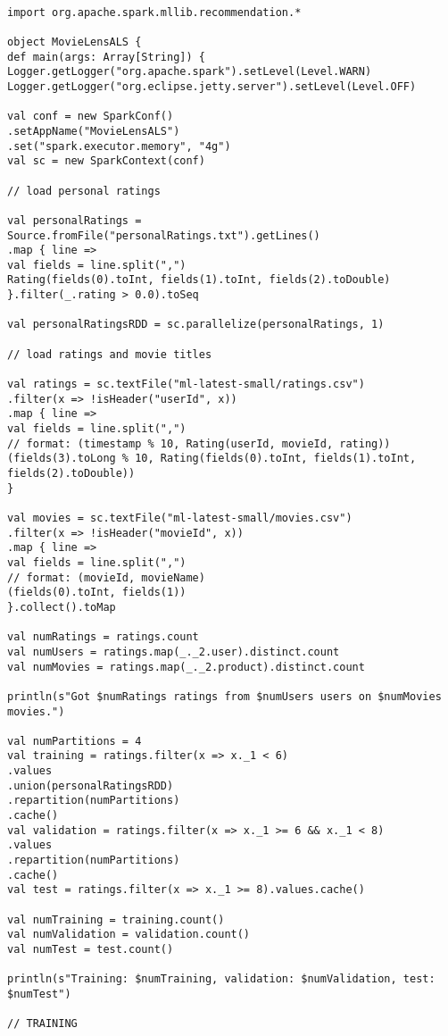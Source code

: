 \documentclass[main.tex]{thesis.tex}
\begin{document}
\begin{lstlisting}[caption=MovieLensALS.scala]

import org.apache.spark.mllib.recommendation.*

object MovieLensALS {
def main(args: Array[String]) {
Logger.getLogger("org.apache.spark").setLevel(Level.WARN)
Logger.getLogger("org.eclipse.jetty.server").setLevel(Level.OFF)

val conf = new SparkConf()
.setAppName("MovieLensALS")
.set("spark.executor.memory", "4g")
val sc = new SparkContext(conf)

// load personal ratings

val personalRatings = Source.fromFile("personalRatings.txt").getLines()
.map { line =>
val fields = line.split(",")
Rating(fields(0).toInt, fields(1).toInt, fields(2).toDouble)
}.filter(_.rating > 0.0).toSeq

val personalRatingsRDD = sc.parallelize(personalRatings, 1)

// load ratings and movie titles

val ratings = sc.textFile("ml-latest-small/ratings.csv")
.filter(x => !isHeader("userId", x))
.map { line =>
val fields = line.split(",")
// format: (timestamp % 10, Rating(userId, movieId, rating))
(fields(3).toLong % 10, Rating(fields(0).toInt, fields(1).toInt, fields(2).toDouble))
}

val movies = sc.textFile("ml-latest-small/movies.csv")
.filter(x => !isHeader("movieId", x))
.map { line =>
val fields = line.split(",")
// format: (movieId, movieName)
(fields(0).toInt, fields(1))
}.collect().toMap

val numRatings = ratings.count
val numUsers = ratings.map(_._2.user).distinct.count
val numMovies = ratings.map(_._2.product).distinct.count

println(s"Got $numRatings ratings from $numUsers users on $numMovies movies.")

val numPartitions = 4
val training = ratings.filter(x => x._1 < 6)
.values
.union(personalRatingsRDD)
.repartition(numPartitions)
.cache()
val validation = ratings.filter(x => x._1 >= 6 && x._1 < 8)
.values
.repartition(numPartitions)
.cache()
val test = ratings.filter(x => x._1 >= 8).values.cache()

val numTraining = training.count()
val numValidation = validation.count()
val numTest = test.count()

println(s"Training: $numTraining, validation: $numValidation, test: $numTest")

// TRAINING


\end{lstlisting}
\end{document}
